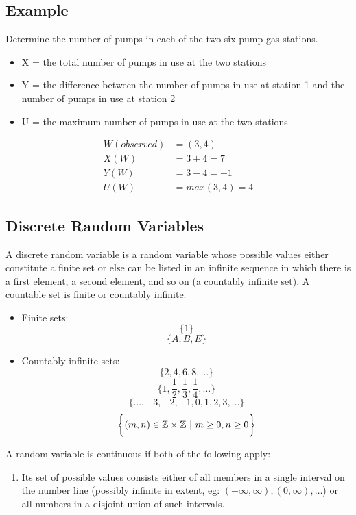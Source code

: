 \documentclass[letterpaper, 12pt]{math}
\begin{document}
\subsection*{Example}
Determine the number of pumps in each of the two six-pump gas stations.
\begin{itemize}
  \item X = the total number of pumps in use at the two stations
  \item Y = the difference between the number of pumps in use at station 1 and
    the number of pumps in use at station 2
  \item U = the maximum number of pumps in use at the two stations
\end{itemize}
\begin{align*}
  W(observed) &= (3,4) \\
  X(W) &= 3+4 = 7 \\
  Y(W) &= 3-4 = -1 \\
  U(W) &= max(3,4) = 4
\end{align*}

\subsection*{Discrete Random Variables}
A discrete random variable is a random variable whose possible values either
constitute a finite set or else can be listed in an infinite sequence in which
there is a first element, a second element, and so on (a countably infinite
set). A countable set is finite or countably infinite.
\begin{itemize}
  \item Finite sets:
    \[ \bigg\{ 1 \bigg\} \]
    \[ \bigg\{ A,B,E \bigg\} \]
  \item Countably infinite sets:
    \[ \bigg\{ 2,4,6,8,\dots \bigg\} \]
    \[ \bigg\{ 1,\frac{1}{2},\frac{1}{3},\frac{1}{4},\dots \bigg\} \]
    \[ \bigg\{ \dots,-3,-2,-1,0,1,2,3,\dots \bigg\} \]
    \[ \bigg\{ (m,n)\in\mathbb{Z}\times\mathbb{Z}\ |\ m\geq 0,n\geq 0 \bigg\} \]
\end{itemize}
A random variable is continuous if both of the following apply:
\begin{enumerate}
  \item Its set of possible values consists either of all members in a single
    interval on the number line (possibly infinite in extent, eg:
    \( (-\infty,\infty),(0,\infty),\dots \)) or all numbers in a disjoint
    union of such intervals.
\end{enumerate}
\end{document}
